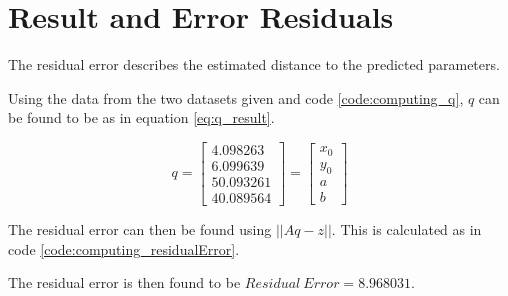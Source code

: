 \section{Result and Error Residuals}
The residual error describes the estimated distance to the predicted parameters.



Using the data from the two datasets given and code \ref{code:computing_q}, $q$ can be found to be as in equation \ref{eq:q_result}.



        
        
 

\begin{equation}
q = 
\left[
\begin{array}{c}
4.098263 \\
6.099639 \\
50.093261 \\
40.089564
\end{array}
\right]
= 
\left[
\begin{array}{c}
x_0 \\
y_0 \\
a \\
b
\end{array}
\right]
\label{eq:q_result}
\end{equation}

The residual error can then be found using $|| Aq - z ||$.
This is calculated as in code \ref{code:computing_residualError}.



The residual error is then found to be $Residual\ Error = 8.968031$.
